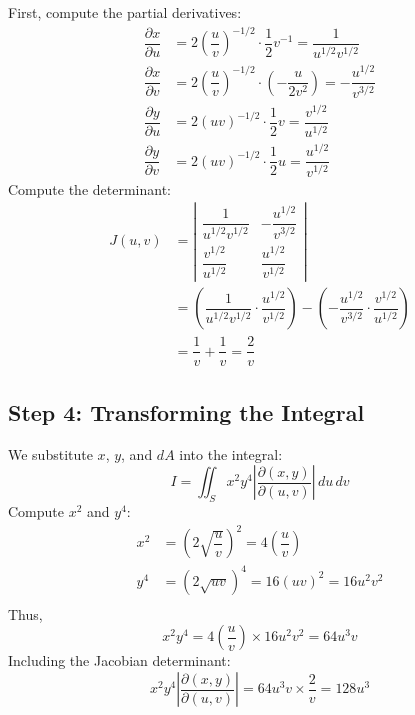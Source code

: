 \documentclass[11pt]{article}
\begin{document}
First, compute the partial derivatives:
\[
\begin{aligned}
\dfrac{\partial x}{\partial u} &= 2 \left( \dfrac{u}{v} \right)^{-1/2} \cdot \dfrac{1}{2} v^{-1} = \dfrac{1}{u^{1/2} v^{1/2}} \\
\dfrac{\partial x}{\partial v} &= 2 \left( \dfrac{u}{v} \right)^{-1/2} \cdot \left( -\dfrac{u}{2 v^2} \right) = -\dfrac{u^{1/2}}{v^{3/2}} \\
\dfrac{\partial y}{\partial u} &= 2 (u v)^{-1/2} \cdot \dfrac{1}{2} v = \dfrac{v^{1/2}}{u^{1/2}} \\
\dfrac{\partial y}{\partial v} &= 2 (u v)^{-1/2} \cdot \dfrac{1}{2} u = \dfrac{u^{1/2}}{v^{1/2}}
\end{aligned}
\]
Compute the determinant:
\[
\begin{aligned}
J(u,v) &= \left| \begin{array}{cc}
\dfrac{1}{u^{1/2} v^{1/2}} & -\dfrac{u^{1/2}}{v^{3/2}} \\
\dfrac{v^{1/2}}{u^{1/2}} & \dfrac{u^{1/2}}{v^{1/2}}
\end{array} \right| \\
&= \left( \dfrac{1}{u^{1/2} v^{1/2}} \cdot \dfrac{u^{1/2}}{v^{1/2}} \right) - \left( -\dfrac{u^{1/2}}{v^{3/2}} \cdot \dfrac{v^{1/2}}{u^{1/2}} \right) \\
&= \dfrac{1}{v} + \dfrac{1}{v} = \dfrac{2}{v}
\end{aligned}
\]

\newpage

\subsection{Step 4: Transforming the Integral}

We substitute \( x \), \( y \), and \( dA \) into the integral:
\[
I = \iint_{S} x^2 y^4 \left| \dfrac{\partial(x,y)}{\partial(u,v)} \right| \, du \, dv
\]
Compute \( x^2 \) and \( y^4 \):
\[
\begin{aligned}
x^2 &= \left( 2 \sqrt{\dfrac{u}{v}} \right)^2 = 4 \left( \dfrac{u}{v} \right) \\
y^4 &= \left( 2 \sqrt{u v} \right)^4 = 16 (u v)^2 = 16 u^2 v^2 \\
\end{aligned}
\]
Thus,
\[
x^2 y^4 = 4 \left( \dfrac{u}{v} \right) \times 16 u^2 v^2 = 64 u^3 v
\]
Including the Jacobian determinant:
\[
x^2 y^4 \left| \dfrac{\partial(x,y)}{\partial(u,v)} \right| = 64 u^3 v \times \dfrac{2}{v} = 128 u^3
\]

\newpage
\end{document}
